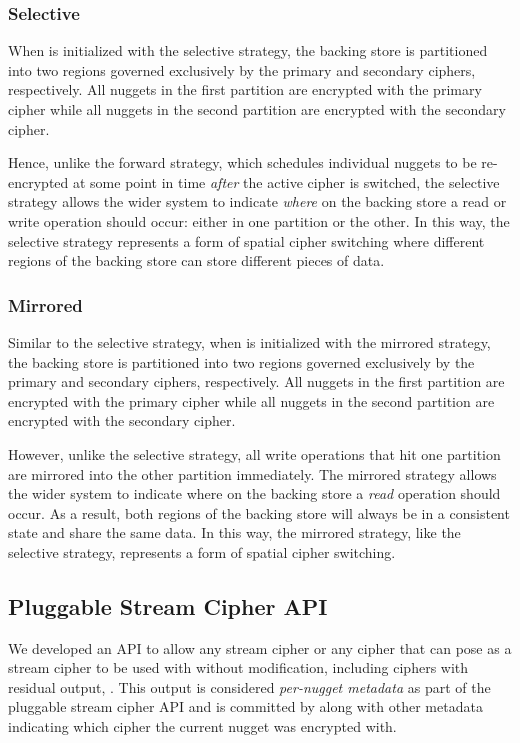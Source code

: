 \subsubsection{Selective}

When \SYSTEM{} is initialized with the selective strategy, the backing store is
partitioned into two regions governed exclusively by the primary and secondary
ciphers, respectively. All nuggets in the first partition are encrypted with the
primary cipher while all nuggets in the second partition are encrypted with the
secondary cipher.

Hence, unlike the forward strategy, which schedules individual nuggets to be
re-encrypted at some point in time \emph{after} the active cipher is switched,
the selective strategy allows the wider system to indicate \emph{where} on the
backing store a read or write operation should occur: either in one partition or
the other. In this way, the selective strategy represents a form of spatial
cipher switching where different regions of the backing store can store
different pieces of data.

\subsubsection{Mirrored}

Similar to the selective strategy, when \SYSTEM{} is initialized with the
mirrored strategy, the backing store is partitioned into two regions governed
exclusively by the primary and secondary ciphers, respectively. All nuggets in
the first partition are encrypted with the primary cipher while all nuggets in
the second partition are encrypted with the secondary cipher.

However, unlike the selective strategy, all write operations that hit one
partition are mirrored into the other partition immediately. The mirrored
strategy allows the wider system to indicate where on the backing store a
\emph{read} operation should occur. As a result, both regions of the backing
store will always be in a consistent state and share the same data. In this way,
the mirrored strategy, like the selective strategy, represents a form of spatial
cipher switching.

\subsection{Pluggable Stream Cipher API}

We developed an API to allow any stream cipher or any cipher that can pose as a
stream cipher to be used with \SYSTEM{} without modification, including ciphers
with residual output, . This output is considered \emph{per-nugget
metadata} as part of the pluggable stream cipher API and is committed by
\SYSTEM{} along with other metadata indicating which cipher the current nugget
was encrypted with.

